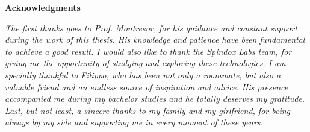 \thispagestyle{empty}

\begin{center}
  {\bf \Huge Acknowledgments}
\end{center}

\vspace{4cm}


\emph{
  The first thanks goes to Prof. Montresor, for his guidance and constant support during the work of this thesis. His knowledge and patience have been fundamental to achieve a good result. I would also like to thank the Spindox Labs team, for giving me the opportunity of studying and exploring these technologies. I am specially thankful to Filippo, who has been not only a roommate, but also a valuable friend and an endless source of inspiration and advice. His presence accompanied me during my bachelor studies and he totally deserves my gratitude. Last, but not least, a sincere thanks to my family and my girlfriend, for being always by my side and supporting me in every moment of these years.
}
